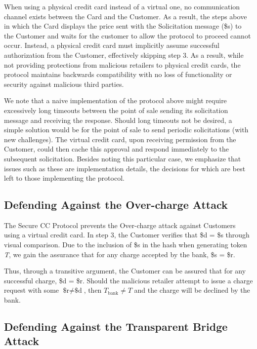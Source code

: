 When using a physical credit card instead of a virtual one, no communication channel exists between the Card and the Customer.
As a result, the steps above in which the Card displays the price sent with the Solicitation message (\$s) to the Customer and waits for the customer to allow the protocol to proceed cannot occur.
Instead, a physical credit card must implicitly assume successful authorization from the Customer, effectively skipping step 3.
As a result, while not providing protections from malicious retailers to physical credit cards, the protocol maintains backwards compatibility with no loss of functionality or security against malicious third parties.

We note that a naive implementation of the protocol above might require excessively long timeouts between the point of sale sending its solicitation message and receiving the response.
Should long timeouts not be desired, a simple solution would be for the point of sale to send periodic solicitations (with new challenges).
The virtual credit card, upon receiving permission from the Customer, could then cache this approval and respond immediately to the subsequent solicitation.
Besides noting this particular case, we emphasize that issues such as these are implementation details, the decisions for which are best left to those implementing the protocol.

\subsection{Defending Against the Over-charge Attack}

The Secure CC Protocol prevents the Over-charge attack against Customers using a virtual credit card.
In step 3, the Customer verifies that \linebreak \$d = \$s through visual comparison.
Due to the inclusion of \$s in the hash when generating token \emph{T}, we gain the assurance that for any charge accepted by the bank, \$s = \$r.

Thus, through a transitive argument, the Customer can be assured that for any successful charge, \$d = \$r.
Should the malicious retailer attempt to issue a charge request with some $\text{\$r} \neq \text{\$d}$, then $T_{\text{bank}} \neq T$ and the charge will be declined by the bank.

\subsection{Defending Against the Transparent Bridge Attack}

